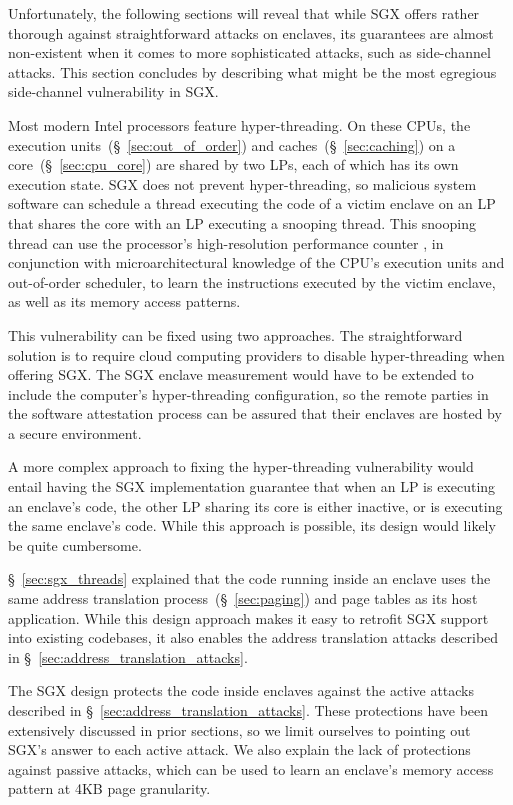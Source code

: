 Unfortunately, the following sections will reveal that while SGX offers rather
thorough against straightforward attacks on enclaves, its guarantees are almost
non-existent when it comes to more sophisticated attacks, such as side-channel
attacks. This section concludes by describing what might be the most egregious
side-channel vulnerability in SGX.

Most modern Intel processors feature hyper-threading. On these CPUs, the
execution units~(\S~\ref{sec:out_of_order}) and caches~(\S~\ref{sec:caching})
on a core~(\S~\ref{sec:cpu_core}) are shared by two LPs, each of which has its
own execution state. SGX does not prevent hyper-threading, so malicious system
software can schedule a thread executing the code of a victim enclave on an
LP that shares the core with an LP executing a snooping thread. This snooping
thread can use the processor's high-resolution performance counter
\cite{petters1999making}, in conjunction with microarchitectural knowledge of
the CPU's execution units and out-of-order scheduler, to learn the instructions
executed by the victim enclave, as well as its memory access patterns.

This vulnerability can be fixed using two approaches. The straightforward
solution is to require cloud computing providers to disable hyper-threading
when offering SGX. The SGX enclave measurement would have to be extended to
include the computer's hyper-threading configuration, so the remote parties in
the software attestation process can be assured that their enclaves are hosted
by a secure environment.

A more complex approach to fixing the hyper-threading vulnerability would
entail having the SGX implementation guarantee that when an LP is executing an
enclave's code, the other LP sharing its core is either inactive, or is
executing the same enclave's code. While this approach is possible, its design
would likely be quite cumbersome.


\label{sec:sgx_vs_memory_mapping_attacks}

\S~\ref{sec:sgx_threads} explained that the code running inside an enclave uses
the same address translation process~(\S~\ref{sec:paging}) and page tables as
its host application. While this design approach makes it easy to retrofit SGX
support into existing codebases, it also enables the address translation
attacks described in \S~\ref{sec:address_translation_attacks}.

The SGX design protects the code inside enclaves against the active attacks
described in \S~\ref{sec:address_translation_attacks}. These protections have
been extensively discussed in prior sections, so we limit ourselves to
pointing out SGX's answer to each active attack. We also explain the lack of
protections against passive attacks, which can be used to learn an enclave's
memory access pattern at 4KB page granularity.

